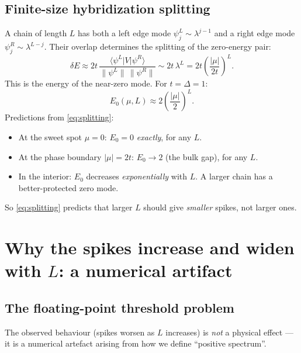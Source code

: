 \documentclass[11pt]{article}
\begin{document}
\subsection{Finite-size hybridization splitting}

A chain of length $L$ has both a left edge mode $\psi^L_j \sim \lambda^{j-1}$
and a right edge mode $\psi^R_j \sim \lambda^{L-j}$.
Their overlap determines the splitting of the zero-energy pair:
\begin{equation}
  \delta E \approx 2t\,\frac{\langle\psi^L | V | \psi^R\rangle}
                             {\|\psi^L\|\,\|\psi^R\|}
  \sim 2t\,\lambda^L = 2t\left(\frac{|\mu|}{2t}\right)^L.
\end{equation}
This is the energy of the near-zero mode.
For $t = \Delta = 1$:
\begin{equation}
  \boxed{E_0(\mu, L) \approx 2\left(\frac{|\mu|}{2}\right)^L.}
  \label{eq:splitting}
\end{equation}
Predictions from \eqref{eq:splitting}:
\begin{itemize}
  \item At the sweet spot $\mu = 0$: $E_0 = 0$ \emph{exactly}, for any $L$.
  \item At the phase boundary $|\mu| = 2t$: $E_0 \to 2$ (the bulk gap), for any $L$.
  \item In the interior: $E_0$ decreases \emph{exponentially} with $L$.
    A larger chain has a better-protected zero mode.
\end{itemize}
So \eqref{eq:splitting} predicts that larger $L$ should give
\emph{smaller} spikes, not larger ones.

\section{Why the spikes increase and widen with $L$: a numerical artifact}

\subsection{The floating-point threshold problem}

The observed behaviour (spikes worsen as $L$ increases) is \emph{not}
a physical effect — it is a numerical artefact arising from how we
define ``positive spectrum''.
\end{document}
